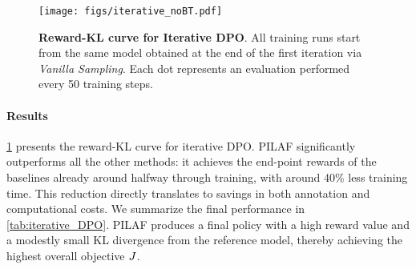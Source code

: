 
\begin{figure}[ht]
    \centering
    \texttt{[image: figs/iterative\_noBT.pdf]}
    \caption{\textbf{Reward-KL curve for Iterative DPO}. All training runs start from the same model obtained at the end of the first iteration via \textit{Vanilla Sampling}. Each dot represents an evaluation performed every 50 training steps.}
    \label{fig:iterative_DPO}
\end{figure}

\paragraph{Results} \cref{fig:iterative_DPO} presents the reward-KL curve for iterative DPO. PILAF  significantly outperforms all the other methods: it achieves the end-point rewards of the baselines already around halfway through training, with around 40\% less training time. This reduction directly translates to savings in both annotation and computational costs. We summarize the final performance in \cref{tab:iterative_DPO}. PILAF produces a final policy with a high reward value and a modestly small KL divergence from the reference model, thereby achieving the highest overall objective $J$.



